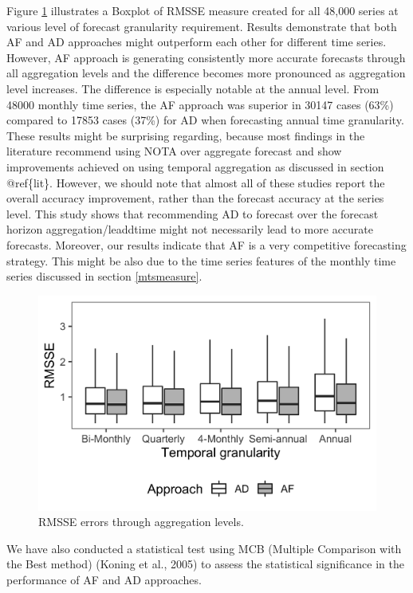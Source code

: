 \documentclass[]{elsarticle} %
\begin{document}
Figure \ref{fig:RMSSE} illustrates a Boxplot of RMSSE measure created
for all 48,000 series at various level of forecast granularity
requirement. Results demonstrate that both AF and AD approaches might
outperform each other for different time series. However, AF approach is
generating consistently more accurate forecasts through all aggregation
levels and the difference becomes more pronounced as aggregation level
increases. The difference is especially notable at the annual level.
From 48000 monthly time series, the AF approach was superior in 30147
cases (63\%) compared to 17853 cases (37\%) for AD when forecasting
annual time granularity. These results might be surprising regarding,
because most findings in the literature recommend using NOTA over
aggregate forecast and show improvements achieved on using temporal
aggregation as discussed in section @ref\{lit\}. However, we should note
that almost all of these studies report the overall accuracy
improvement, rather than the forecast accuracy at the series level. This
study shows that recommending AD to forecast over the forecast horizon
aggregation/leaddtime might not necessarily lead to more accurate
forecasts. Moreover, our results indicate that AF is a very competitive
forecasting strategy. This might be also due to the time series features
of the monthly time series discussed in section \ref{mtsmeasure}.

\begin{figure}[H]

{\centering \includegraphics[width=0.7\linewidth]{img/300dpi/box_plot_rmsse} 

}

\caption{RMSSE errors through aggregation levels.}\label{fig:RMSSE}
\end{figure}

We have also conducted a statistical test using MCB (Multiple Comparison
with the Best method) (Koning et al., 2005) to assess the statistical
significance in the performance of AF and AD approaches.
\end{document}
